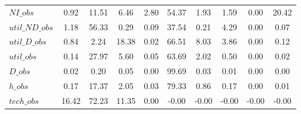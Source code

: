 \begin{center}
\begin{longtable}{lccccccccc}
$NI\_obs        $	 & 	         0.92	 & 	        11.51	 & 	         6.46	 & 	         2.80	 & 	        54.37	 & 	         1.93	 & 	         1.59	 & 	         0.00	 & 	        20.42 \\ 
$util\_ND\_obs  $	 & 	         1.18	 & 	        56.33	 & 	         0.29	 & 	         0.09	 & 	        37.54	 & 	         0.21	 & 	         4.29	 & 	         0.00	 & 	         0.07 \\ 
$util\_D\_obs   $	 & 	         0.84	 & 	         2.24	 & 	        18.38	 & 	         0.02	 & 	        66.51	 & 	         8.03	 & 	         3.86	 & 	         0.00	 & 	         0.12 \\ 
$util\_obs      $	 & 	         0.14	 & 	        27.97	 & 	         5.60	 & 	         0.05	 & 	        63.69	 & 	         2.02	 & 	         0.50	 & 	         0.00	 & 	         0.02 \\ 
$D\_obs         $	 & 	         0.02	 & 	         0.20	 & 	         0.05	 & 	         0.00	 & 	        99.69	 & 	         0.03	 & 	         0.01	 & 	         0.00	 & 	         0.00 \\ 
$h\_obs         $	 & 	         0.17	 & 	        17.37	 & 	         2.05	 & 	         0.03	 & 	        79.33	 & 	         0.86	 & 	         0.17	 & 	         0.00	 & 	         0.01 \\ 
$tech\_obs      $	 & 	        16.42	 & 	        72.23	 & 	        11.35	 & 	         0.00	 & 	        -0.00	 & 	        -0.00	 & 	        -0.00	 & 	        -0.00	 & 	        -0.00 \\ 
\end{longtable}
 \end{center}
